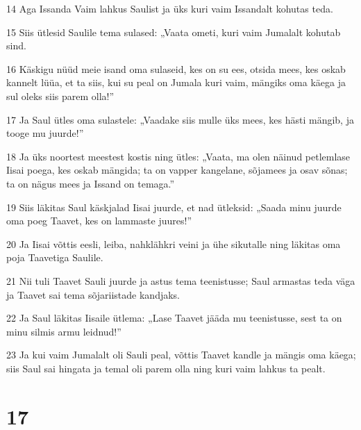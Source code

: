 \par 14 Aga Issanda Vaim lahkus Saulist ja üks kuri vaim Issandalt kohutas teda.
\par 15 Siis ütlesid Saulile tema sulased: „Vaata ometi, kuri vaim Jumalalt kohutab sind.
\par 16 Käskigu nüüd meie isand oma sulaseid, kes on su ees, otsida mees, kes oskab kannelt lüüa, et ta siis, kui su peal on Jumala kuri vaim, mängiks oma käega ja sul oleks siis parem olla!”
\par 17 Ja Saul ütles oma sulastele: „Vaadake siis mulle üks mees, kes hästi mängib, ja tooge mu juurde!”
\par 18 Ja üks noortest meestest kostis ning ütles: „Vaata, ma olen näinud petlemlase Iisai poega, kes oskab mängida; ta on vapper kangelane, sõjamees ja osav sõnas; ta on nägus mees ja Issand on temaga.”
\par 19 Siis läkitas Saul käskjalad Iisai juurde, et nad ütleksid: „Saada minu juurde oma poeg Taavet, kes on lammaste juures!”
\par 20 Ja Iisai võttis eesli, leiba, nahklähkri veini ja ühe sikutalle ning läkitas oma poja Taavetiga Saulile.
\par 21 Nii tuli Taavet Sauli juurde ja astus tema teenistusse; Saul armastas teda väga ja Taavet sai tema sõjariistade kandjaks.
\par 22 Ja Saul läkitas Iisaile ütlema: „Lase Taavet jääda mu teenistusse, sest ta on minu silmis armu leidnud!”
\par 23 Ja kui vaim Jumalalt oli Sauli peal, võttis Taavet kandle ja mängis oma käega; siis Saul sai hingata ja temal oli parem olla ning kuri vaim lahkus ta pealt.

\chapter{17}

